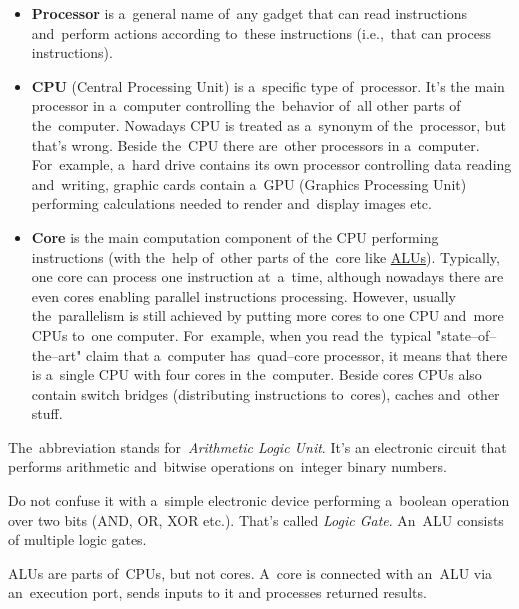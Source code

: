 \label{processorcpucore}
\begin{itemize}
    \item \textbf{Processor} is a~general name of~any gadget that can read instructions and~perform actions according to~these instructions (i.e.,~that can process instructions).
    \item \textbf{CPU} (Central Processing Unit) is a~specific type of~processor.
          It's the main processor in a~computer controlling the~behavior of~all other parts of the~computer.
          Nowadays CPU is treated as a~synonym of the~processor, but that's wrong.
          Beside the~CPU there are~other processors in a~computer.
          For~example, a~hard drive contains its own processor controlling data reading and~writing, graphic cards contain a~GPU (Graphics Processing Unit) performing calculations needed to render and~display images etc.
    \item \textbf{Core} is the main computation component of the CPU performing instructions (with the~help of~other parts of the~core like \hyperref[alu]{ALUs}).
          Typically, one core can process one instruction at~a~time, although nowadays there are even cores enabling parallel instructions processing.
          However, usually the~parallelism is still achieved by putting more cores to one CPU and~more CPUs to~one computer.
          For~example, when you read the~typical "state--of--the--art" claim that a~computer has~quad--core processor, it means that there is a~single CPU with four cores in the~computer.
          Beside cores CPUs also contain switch bridges (distributing instructions to~cores), caches and~other stuff.
\end{itemize}

\label{alu}
The~abbreviation stands for~\textit{Arithmetic Logic Unit}.
It's an electronic circuit that performs arithmetic and~bitwise operations on~integer binary numbers.

\warning Do not confuse it with a~simple electronic device performing a~boolean operation over two bits (AND, OR, XOR etc.).
That's called \textit{Logic Gate}.
An~ALU consists of multiple logic gates.

\warning ALUs are parts of~CPUs, but not cores.
A~core is connected with an~ALU via an~execution port, sends inputs to it and processes returned results.

